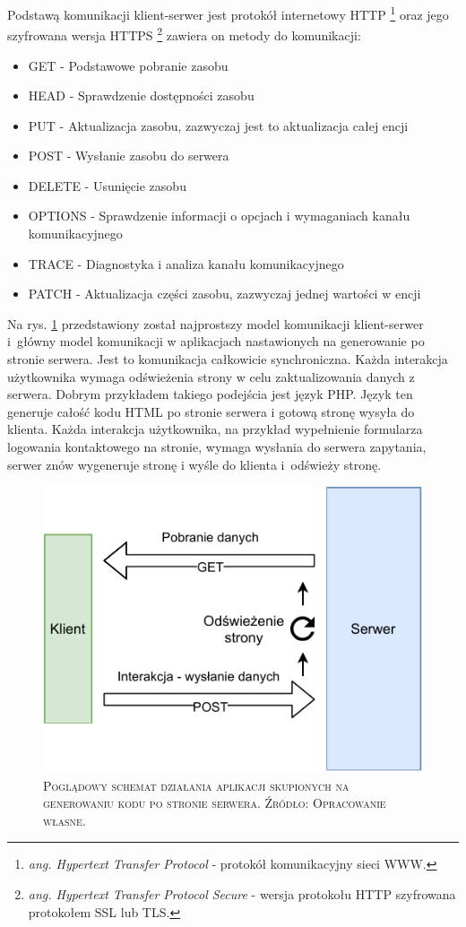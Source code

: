 \documentclass[12pt,a4paper,oneside]{book}
\newcommand{\captionT}[1]{\caption{\textsc{\footnotesize{#1}}}}
\begin{document}
Podstawą komunikacji klient-serwer jest protokół internetowy HTTP \footnote{\textit{ang. Hypertext Transfer Protocol} - protokół komunikacyjny sieci WWW.} oraz jego szyfrowana wersja HTTPS \footnote{\textit{ang. Hypertext Transfer Protocol Secure} - wersja protokołu HTTP szyfrowana protokołem SSL lub TLS.} zawiera on metody do komunikacji:

\begin{itemize}
  \item GET - Podstawowe pobranie zasobu
  \item HEAD - Sprawdzenie dostępności zasobu
  \item PUT - Aktualizacja zasobu, zazwyczaj jest to aktualizacja całej encji
  \item POST - Wysłanie zasobu do serwera
  \item DELETE - Usunięcie zasobu
  \item OPTIONS - Sprawdzenie informacji o opcjach i wymaganiach kanału komunikacyjnego
  \item TRACE - Diagnostyka i analiza kanału komunikacyjnego
  \item PATCH - Aktualizacja części zasobu, zazwyczaj jednej wartości w encji
\end{itemize}

Na rys. \ref{rys_server_update} przedstawiony został najprostszy model komunikacji klient-serwer i~główny model komunikacji w aplikacjach nastawionych na generowanie po stronie serwera. Jest to komunikacja całkowicie synchroniczna. Każda interakcja użytkownika wymaga odświeżenia strony w celu zaktualizowania danych z serwera. Dobrym przykładem takiego podejścia jest język PHP. Język ten generuje całość kodu HTML po stronie serwera i gotową stronę wysyła do klienta. Każda interakcja użytkownika, na przykład wypełnienie formularza logowania kontaktowego na stronie, wymaga wysłania do serwera zapytania, serwer znów wygeneruje stronę i wyśle do klienta i~odświeży stronę. 

\begin{figure}[H]
\centering
\includegraphics[width=1\textwidth]{images/ServerUpdate.pdf}
\captionT{Poglądowy schemat działania aplikacji skupionych na generowaniu kodu po stronie serwera. Źródło: Opracowanie własne.}
\label{rys_server_update}
\end{figure}
\end{document}
